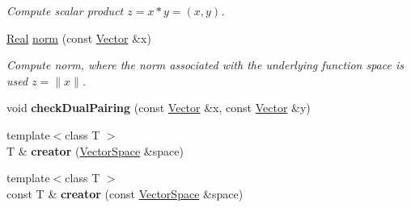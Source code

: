 \begin{DoxyCompactItemize}
\begin{DoxyCompactList}\small\item\em Compute scalar product $z=x*y=(x,y)$. \end{DoxyCompactList}\item 
\hypertarget{namespaceSpacy_a86a4fc266aa19a07b0af16388907354b}{}\hyperlink{classSpacy_1_1Real}{Real} \hyperlink{namespaceSpacy_a86a4fc266aa19a07b0af16388907354b}{norm} (const \hyperlink{classSpacy_1_1Vector}{Vector} \&x)\label{namespaceSpacy_a86a4fc266aa19a07b0af16388907354b}

\begin{DoxyCompactList}\small\item\em Compute norm, where the norm associated with the underlying function space is used $ z = \|x\| $. \end{DoxyCompactList}\item 
\hypertarget{namespaceSpacy_ac354f06d21282619482e3ef4a841cd76}{}void {\bfseries check\+Dual\+Pairing} (const \hyperlink{classSpacy_1_1Vector}{Vector} \&x, const \hyperlink{classSpacy_1_1Vector}{Vector} \&y)\label{namespaceSpacy_ac354f06d21282619482e3ef4a841cd76}

\item 
\hypertarget{namespaceSpacy_affaca762d59da675eef594854762cdcd}{}{\footnotesize template$<$class T $>$ }\\T \& {\bfseries creator} (\hyperlink{classSpacy_1_1VectorSpace}{Vector\+Space} \&space)\label{namespaceSpacy_affaca762d59da675eef594854762cdcd}

\item 
\hypertarget{namespaceSpacy_aed55e3a3401be0e74e174a12858baffa}{}{\footnotesize template$<$class T $>$ }\\const T \& {\bfseries creator} (const \hyperlink{classSpacy_1_1VectorSpace}{Vector\+Space} \&space)\label{namespaceSpacy_aed55e3a3401be0e74e174a12858baffa}


\end{DoxyCompactItemize}
